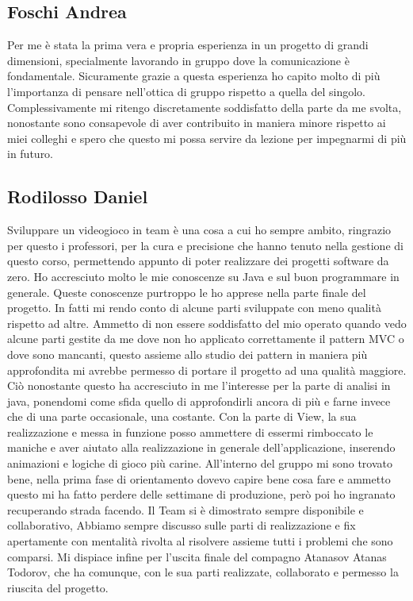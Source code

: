 \documentclass[a4paper,12pt]{report}
\begin{document}
\subsection{Foschi Andrea}
Per me è stata la prima vera e propria esperienza in un progetto di grandi dimensioni, specialmente lavorando in gruppo dove la comunicazione è fondamentale. Sicuramente grazie a questa esperienza ho capito molto di più l’importanza di pensare nell’ottica di gruppo rispetto a quella del singolo. Complessivamente mi ritengo discretamente soddisfatto della parte da me svolta, nonostante sono consapevole di aver contribuito in maniera minore rispetto ai miei colleghi e spero che questo mi possa servire da lezione per impegnarmi di più in futuro.

\subsection{Rodilosso Daniel}
Sviluppare un videogioco in team è una cosa a cui ho sempre ambito, ringrazio per questo i professori, per la cura e precisione che 
hanno tenuto nella gestione di questo corso, permettendo appunto di poter realizzare dei progetti software da zero.
Ho accresciuto molto le mie conoscenze su Java e sul buon programmare in generale.
Queste conoscenze purtroppo le ho apprese nella parte finale del progetto.
In fatti mi rendo conto di alcune parti sviluppate con meno qualità rispetto ad altre.
Ammetto di non essere soddisfatto del mio operato quando vedo alcune parti gestite da me dove non ho applicato correttamente il pattern MVC o dove sono mancanti, questo assieme allo studio dei pattern in maniera più approfondita mi avrebbe permesso di portare il progetto ad una 
qualità maggiore. Ciò nonostante questo ha accresciuto in me l’interesse per la parte di analisi in java, ponendomi come sfida quello di approfondirli ancora 
di più e farne invece che di una parte occasionale, una costante.
Con la parte di View, la sua realizzazione e messa in funzione posso ammettere di essermi rimboccato le maniche e aver aiutato alla 
realizzazione in generale dell’applicazione, inserendo animazioni e logiche di gioco più carine. 
All’interno del gruppo mi sono trovato bene, nella prima fase di orientamento dovevo capire bene cosa fare e ammetto questo mi ha fatto perdere delle settimane di produzione, però poi ho ingranato recuperando strada facendo. Il Team si è dimostrato sempre disponibile e collaborativo,
Abbiamo sempre discusso sulle parti di realizzazione e fix apertamente con mentalità rivolta al risolvere assieme tutti i problemi che sono comparsi. Mi dispiace infine per l’uscita finale del compagno Atanasov Atanas Todorov, che ha comunque, con le sua parti realizzate, collaborato e permesso la riuscita del progetto.
\end{document}
